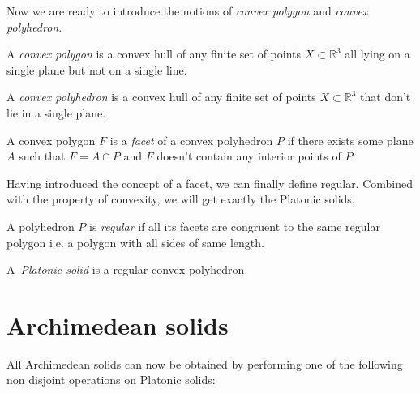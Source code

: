 Now we are ready to introduce the notions of \emph{convex polygon} and \emph{convex polyhedron}.

\begin{define}
A {\sl convex polygon} is a convex hull of any finite set of points $X \subset \mathbb{R}^3$ all lying on a single plane but not on a single line.
\end{define}

\begin{define}
A {\sl convex polyhedron} is a convex hull of any finite set of points $X \subset \mathbb{R}^3$ that don't lie in a single plane.
\end{define}

\begin{define}
A convex polygon $F$ is a {\sl facet} of a convex polyhedron $P$ if there exists some plane $A$ such that $F=A\cap P$ and $F$ doesn't contain any interior points of $P$.
\end{define}

Having introduced the concept of a facet, we can finally define regular. Combined with the property of convexity, we will get exactly the Platonic solids.

\begin{define}
A polyhedron $P$ is {\sl regular} if all its facets are congruent to the same regular polygon i.e. a polygon with all sides of same length.
\end{define}

\begin{define}
A~{\sl Platonic solid} is a regular convex polyhedron.
\end{define}

\section{Archimedean solids}

All Archimedean solids can now be obtained by performing one of the following non disjoint operations on Platonic solids:

